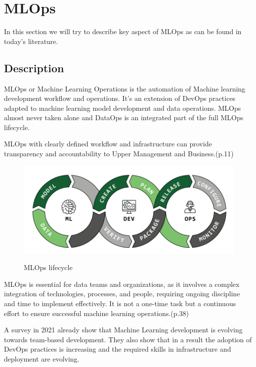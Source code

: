 \section{MLOps}\label{sec:mlops}

In this section we will try to describe key aspect of MLOps as can be found in today's literature.

\subsection{Description}\label{subsec:description}
MLOps or Machine Learning Operations is the automation of Machine learning development workflow and operations.
It's an extension of DevOps practices adapted to machine learning model development and data operations\cite{Kreuzberger2022MachineLO}.
MLOps almost never taken alone and DataOps is an integrated part of the full MLOps lifecycle.

MLOps with clearly defined workflow and infrastructure can provide transparency and accountability to Upper Management and Business.\cite{treveil2020introducing}(p.11)

\begin{figure}[!htbp]
    \caption{MLOps lifecycle\cite{mlops-definition-tools-and-challenge}}
    \centering
    \includegraphics[scale=0.5]{images/ml-dev-ops}
    \label{fig:ml-dev-ops}
\end{figure}

MLOps is essential for data teams and organizations, as it involves a complex integration of technologies, processes, and people, requiring ongoing discipline and time to implement effectively.
It is not a one-time task but a continuous effort to ensure successful machine learning operations.\cite{treveil2020introducing}(p.38)

A survey in 2021\cite{DBLP:journals/corr/abs-2103-08942} already show that Machine Learning development is evolving towards team-based development.
They also show that in a result the adoption of DevOps practices is increasing and the required skills in infrastructure and deployment are evolving.

